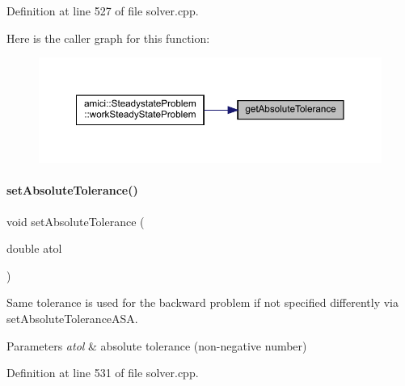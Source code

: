 Definition at line 527 of file solver.\+cpp.

Here is the caller graph for this function\+:
\nopagebreak
\begin{figure}[H]
\begin{center}
\leavevmode
\includegraphics[width=350pt]{classamici_1_1_solver_a676df944b6737474dd4ef74fe9212f3e_icgraph}
\end{center}
\end{figure}
\mbox{\label{classamici_1_1_solver_afe0fd2fad6ce110ad8421f5979945f90}} 
\paragraph{\texorpdfstring{setAbsoluteTolerance()}{setAbsoluteTolerance()}}
{\footnotesize\ttfamily void set\+Absolute\+Tolerance (\begin{DoxyParamCaption}\item[{double}]{atol }\end{DoxyParamCaption})}

Same tolerance is used for the backward problem if not specified differently via set\+Absolute\+Tolerance\+A\+SA.


\begin{DoxyParams}{Parameters}
{\em atol} & absolute tolerance (non-\/negative number) \\
\hline
\end{DoxyParams}


Definition at line 531 of file solver.\+cpp.


